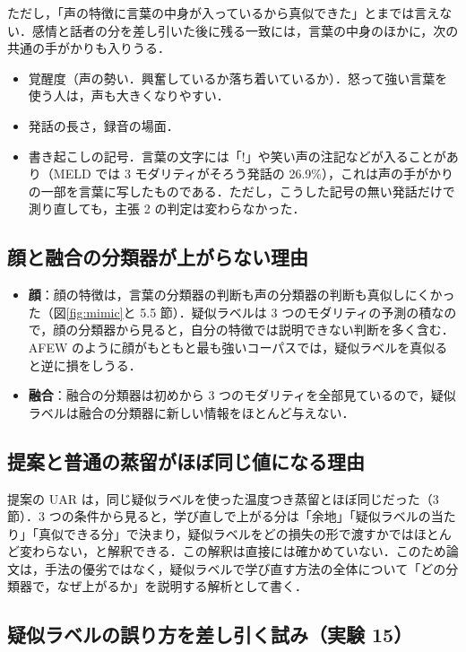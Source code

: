 \documentclass[a4paper,11pt]{ltjsarticle}
\begin{document}
ただし，「声の特徴に言葉の中身が入っているから真似できた」とまでは言えない．感情と話者の分を差し引いた後に残る一致には，言葉の中身のほかに，次の共通の手がかりも入りうる．
\begin{itemize}
  \item 覚醒度（声の勢い．興奮しているか落ち着いているか）．怒って強い言葉を使う人は，声も大きくなりやすい．
  \item 発話の長さ，録音の場面．
  \item 書き起こしの記号．言葉の文字には「!」や笑い声の注記などが入ることがあり（MELD では 3 モダリティがそろう発話の 26.9\%），これは声の手がかりの一部を言葉に写したものである．ただし，こうした記号の無い発話だけで測り直しても，主張 2 の判定は変わらなかった．
\end{itemize}

\subsection{顔と融合の分類器が上がらない理由}

\begin{itemize}
  \item \textbf{顔}：顔の特徴は，言葉の分類器の判断も声の分類器の判断も真似しにくかった（図\ref{fig:mimic}と 5.5 節）．疑似ラベルは 3 つのモダリティの予測の積なので，顔の分類器から見ると，自分の特徴では説明できない判断を多く含む．AFEW のように顔がもともと最も強いコーパスでは，疑似ラベルを真似ると逆に損をしうる．
  \item \textbf{融合}：融合の分類器は初めから 3 つのモダリティを全部見ているので，疑似ラベルは融合の分類器に新しい情報をほとんど与えない．
\end{itemize}

\subsection{提案と普通の蒸留がほぼ同じ値になる理由}

提案の UAR は，同じ疑似ラベルを使った温度つき蒸留とほぼ同じだった（3 節）．3 つの条件から見ると，学び直しで上がる分は「余地」「疑似ラベルの当たり」「真似できる分」で決まり，疑似ラベルをどの損失の形で渡すかではほとんど変わらない，と解釈できる．この解釈は直接には確かめていない．このため論文は，手法の優劣ではなく，疑似ラベルで学び直す方法の全体について「どの分類器で，なぜ上がるか」を説明する解析として書く．

\subsection{疑似ラベルの誤り方を差し引く試み（実験 15）}
\end{document}
